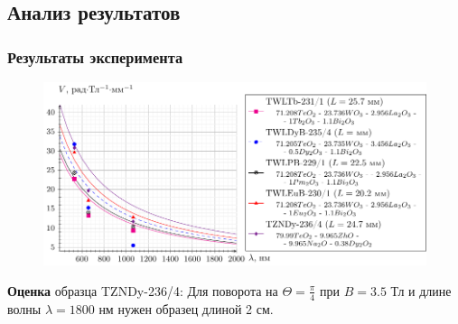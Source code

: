 \documentclass[10pt,pdf,hyperref={unicode}, dvipsnames, handout]{beamer}
\begin{document}
\begin{frame}[t]
	\subsection{Анализ результатов}
	\frametitle{Результаты эксперимента}
	\begin{figure}[tb]
		\centering
		\includegraphics[width=1\textwidth]{images/graph_verde_from_lambda}
	\end{figure}
		\textbf{Оценка} образца TZNDy-236/4: Для поворота на $\Theta=\frac{\pi}{4}$ при $B=3.5$ Тл и длине волны $\lambda=1800$ нм нужен образец длиной 2 см.
\end{frame}
\end{document}
